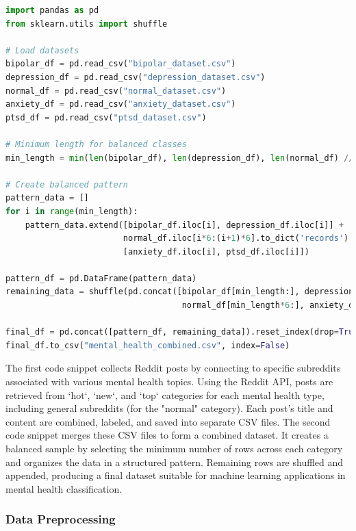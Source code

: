 \begin{tcolorbox}[colback=gray!5!white, colframe=gray!80!black, boxrule=0.5pt, title=Combining Collected Datasets]
\begin{lstlisting}[language=Python]
import pandas as pd
from sklearn.utils import shuffle

# Load datasets
bipolar_df = pd.read_csv("bipolar_dataset.csv")
depression_df = pd.read_csv("depression_dataset.csv")
normal_df = pd.read_csv("normal_dataset.csv")
anxiety_df = pd.read_csv("anxiety_dataset.csv")
ptsd_df = pd.read_csv("ptsd_dataset.csv")

# Minimum length for balanced classes
min_length = min(len(bipolar_df), len(depression_df), len(normal_df) // 6, len(anxiety_df), len(ptsd_df))

# Create balanced pattern
pattern_data = []
for i in range(min_length):
    pattern_data.extend([bipolar_df.iloc[i], depression_df.iloc[i]] +
                        normal_df.iloc[i*6:(i+1)*6].to_dict('records') +
                        [anxiety_df.iloc[i], ptsd_df.iloc[i]])

pattern_df = pd.DataFrame(pattern_data)
remaining_data = shuffle(pd.concat([bipolar_df[min_length:], depression_df[min_length:], 
                                    normal_df[min_length*6:], anxiety_df[min_length:], ptsd_df[min_length:]]))

final_df = pd.concat([pattern_df, remaining_data]).reset_index(drop=True)
final_df.to_csv("mental_health_combined.csv", index=False)
\end{lstlisting}
\end{tcolorbox}
    
\noindent
The first code snippet collects Reddit posts by connecting to specific subreddits associated with various mental health topics. Using the Reddit API, posts are retrieved from `hot`, `new`, and `top` categories for each mental health type, including general subreddits (for the "normal" category). Each post’s title and content are combined, labeled, and saved into separate CSV files. The second code snippet merges these CSV files to form a combined dataset. It creates a balanced sample by selecting the minimum number of rows across each category and organizes the data in a structured pattern. Remaining rows are shuffled and appended, producing a final dataset suitable for machine learning applications in mental health classification.
    

\subsubsection{Data Preprocessing}


